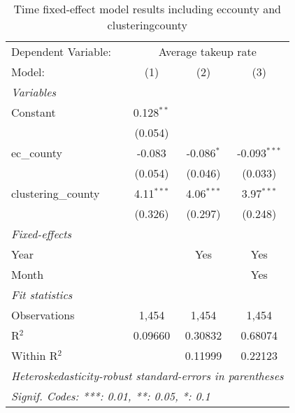 \documentclass{article}
\begin{document}
\begin{table}[htbp] 
   \centering
   \begin{tabular}{lccc}
      \tabularnewline \midrule \midrule
      Dependent Variable: & \multicolumn{3}{c}{Average takeup rate}\\
      Model:              & (1)          & (2)          & (3)\\  
      \midrule
      \emph{Variables}\\
      Constant            & 0.128$^{**}$ &              &   \\   
                          & (0.054)      &              &   \\   
      ec\_county          & -0.083       & -0.086$^{*}$ & -0.093$^{***}$\\   
                          & (0.054)      & (0.046)      & (0.033)\\   
      clustering\_county  & 4.11$^{***}$ & 4.06$^{***}$ & 3.97$^{***}$\\   
                          & (0.326)      & (0.297)      & (0.248)\\   
      \midrule
      \emph{Fixed-effects}\\
      Year                &              & Yes          & Yes\\  
      Month               &              &              & Yes\\  
      \midrule
      \emph{Fit statistics}\\
      Observations        & 1,454        & 1,454        & 1,454\\  
      R$^2$               & 0.09660      & 0.30832      & 0.68074\\  
      Within R$^2$        &              & 0.11999      & 0.22123\\  
      \midrule \midrule
      \multicolumn{4}{l}{\emph{Heteroskedasticity-robust standard-errors in parentheses}}\\
      \multicolumn{4}{l}{\emph{Signif. Codes: ***: 0.01, **: 0.05, *: 0.1}}\\
   \end{tabular}
     \caption{Time fixed-effect model results including ec\textunderscore county and clustering\textunderscore county}
     \label{result2}
\end{table}
\end{document}
